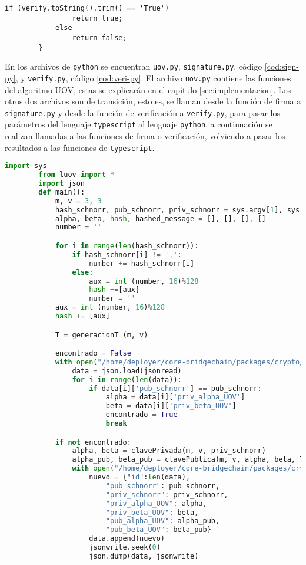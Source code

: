 \begin{itemize}
\begin{lstlisting}[caption=Modificación archivo \texttt{hash.ts} función verifyUOV, label=cod:hash-UOV-verif, style=TypeScript]
			if (verify.toString().trim() == 'True')
				return true;
			else
				return false;
		}
	\end{lstlisting}
	
	
	En los archivos de \texttt{python} se encuentran \texttt{uov.py}, \texttt{signature.py}, código \ref{cod:sign-py}, y \texttt{verify.py}, código \ref{cod:veri-py}. El archivo \texttt{uov.py} contiene las funciones del algoritmo UOV, estas se explicarán en el capítulo \ref{sec:implementacion}. Los otros dos archivos son de transición, esto es, se llaman desde la función de firma a \texttt{signature.py} y desde la función de verificación a \texttt{verify.py}, para pasar los parámetros del lenguaje \texttt{typescript} al lenguaje \texttt{python}, a continuación se realizan llamadas a las funciones de firma o verificación, volviendo a pasar los resultados a las funciones de \texttt{typescript}.\\
	
	\begin{lstlisting}[language=Python,caption=Archivo \texttt{signature.py}, label=cod:sign-py]
		import sys
		from luov import *
		import json
		def main():
			m, v = 3, 3
			hash_schnorr, pub_schnorr, priv_schnorr = sys.argv[1], sys.argv[2], sys.argv[3]
			alpha, beta, hash, hashed_message = [], [], [], []
			number = ''

			for i in range(len(hash_schnorr)):
				if hash_schnorr[i] != ',':
					number += hash_schnorr[i]
				else:
					aux = int (number, 16)%128
					hash +=[aux]
					number = ''
			aux = int (number, 16)%128
			hash += [aux]

			T = generacionT (m, v)

			encontrado = False
			with open("/home/deployer/core-bridgechain/packages/crypto/src/crypto/data.json", "r") as jsonread:
				data = json.load(jsonread)
				for i in range(len(data)):
					if data[i]['pub_schnorr'] == pub_schnorr:
						alpha = data[i]['priv_alpha_UOV']
						beta = data[i]['priv_beta_UOV']
						encontrado = True
						break

			if not encontrado:
				alpha, beta = clavePrivada(m, v, priv_schnorr)
				alpha_pub, beta_pub = clavePublica(m, v, alpha, beta, T)
				with open("/home/deployer/core-bridgechain/packages/crypto/src/crypto/data.json", "w") as jsonwrite:
					nuevo = {"id":len(data),
						"pub_schnorr": pub_schnorr,
						"priv_schnorr": priv_schnorr,
						"priv_alpha_UOV": alpha,
						"priv_beta_UOV": beta,
						"pub_alpha_UOV": alpha_pub,
						"pub_beta_UOV": beta_pub}
					data.append(nuevo)
					jsonwrite.seek(0)
					json.dump(data, jsonwrite)


\end{lstlisting}
\end{itemize}
